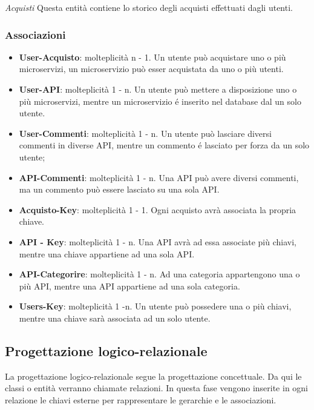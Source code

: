 {{			\textit{Acquisti}
			Questa entità contiene lo storico degli acquisti effettuati dagli utenti.
			\begin{center}
			\begin{table}[H]\caption{Entità Storico}
			\label{ES}
			\end{table}
			\end{center}
	\subsubsection{Associazioni}
		\begin{itemize}
			\item\textbf{User-Acquisto}: molteplicità n - 1. Un utente può acquistare uno o più microservizi, un microservizio può esser acquistata da uno o più utenti.
			\item\textbf{User-API}: molteplicità 1 - n. Un utente può mettere a disposizione uno o più microservizi, mentre un microservizio é inserito nel database dal un solo utente.
			\item\textbf{User-Commenti}: molteplicità 1 - n. Un utente può lasciare diversi commenti in diverse API, mentre un commento é lasciato per forza da un solo utente;
			\item\textbf{API-Commenti}: molteplicità 1 - n. Una API può avere diversi commenti, ma un commento può essere lasciato su una sola API.	
			\item\textbf{Acquisto-Key}: molteplicità 1 - 1. Ogni acquisto avrà associata la propria chiave. 
			\item\textbf{API - Key}: molteplicità 1 - n. Una API avrà ad essa associate più chiavi, mentre una chiave appartiene ad una sola API.
			\item\textbf{API-Categorire}: molteplicità 1 - n. Ad una categoria appartengono una o più API, mentre una API appartiene ad una sola categoria.
			\item\textbf{Users-Key}: molteplicità 1 -n. Un utente può possedere una o più chiavi, mentre una chiave sarà associata ad un solo utente.
		\end{itemize}				
	}
	\subsection{Progettazione logico-relazionale}{
		La progettazione logico-relazionale segue la progettazione concettuale. Da qui le classi o entità verranno chiamate relazioni. In questa fase vengono inserite in ogni relazione le chiavi esterne per rappresentare le gerarchie e le associazioni.
}}
